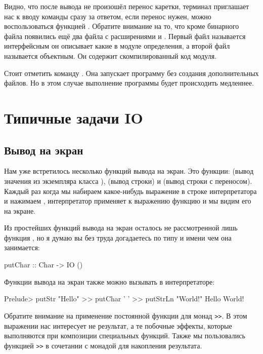 
Видно, что после вывода не произошёл перенос каретки,
терминал приглашает нас к вводу команды сразу за ответом,
если перенос нужен, можно воспользоваться функцией .
Обратите внимание на то, что кроме бинарного файла 
появились ещё два файла с расширениями  и . Первый
файл называется интерфейсным он описывает какие в модуле 
определения, а второй файл называется объектным. Он содержит
скомпилированный код модуля. 

Стоит отметить команду . Она запускает программу
без создания дополнительных файлов. Но в этом случае выполнение
программы будет происходить медленнее. 

\section{Типичные задачи IO}

\subsection{Вывод на экран}

Нам уже встретилось несколько функций вывода на экран.
Это функции:  (вывод значения из экземпляра класса ),
 (вывод строки) и  (вывод строки с переносом).
Каждый раз когда мы набираем какое-нибудь выражение в строке
интерпретатора и нажимаем , интерпретатор применяет
к выражению функцию  и мы видим его на экране.

Из простейших функций вывода на экран осталось не рассмотренной
лишь функция , но я думаю вы без труда догадаетесь
по типу и имени чем она занимается:

\begin{code}
putChar :: Char -> IO ()
\end{code}

Функции вывода на экран также можно вызывать в интерпретаторе:


\begin{code}
Prelude> putStr "Hello" >> putChar ' ' >> putStrLn "World!" 
Hello World!
\end{code}

Обратите внимание на применение постоянной функции для монад
\verb!>>!. В этом выражении нас интересует не результат, 
а те побочные эффекты, которые выполняются при композиции
специальных функций. Также мы пользовались функцией \verb!>>!
в сочетании с монадой  для накопления результата.

